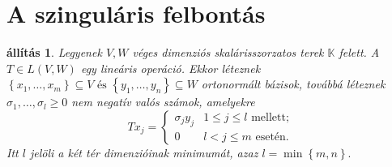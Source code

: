\documentclass[a4paper, showtrims]{memoir}
\theoremstyle{plain}
\newtheorem{proposition}{állítás}[chapter]
\theoremstyle{remark}
\theoremstyle{definition}
\begin{document}
\section{A szinguláris felbontás}
\begin{proposition}
    Legyenek $V,W$ véges dimenziós skalárisszorzatos terek $\mathbb{K}$ felett.
    A $T\in L\left( V,W \right)$ egy lineáris operáció.
    Ekkor léteznek 
    \(
        \left\{ x_1,\dots,x_m \right\}\subseteq V
        \text{ és }
        \left\{ y_1,\dots,y_n \right\}\subseteq W
    \)
    ortonormált bázisok, továbbá léteznek 
    \(
        \sigma_1,\dots,\sigma_l\geq 0
    \)
    nem negatív valós számok, amelyekre
    \[
        Tx_j
        =
            \begin{cases}
                \sigma_jy_j&1\leq j\leq l\text{ mellett;}\\
                0&l<j\leq m\text{ esetén.}
            \end{cases}
    \]
    Itt $l$ jelöli a két tér dimenzióinak minimumát, azaz
    \(
    l=\min\left\{ m,n \right\}.
    \)
    \label{pr:svd}
\end{proposition}
\end{document}
